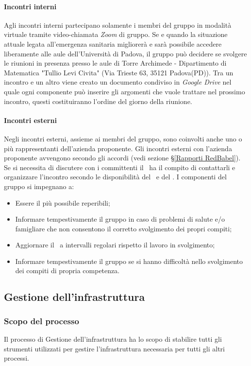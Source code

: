 \paragraph*{Incontri interni}
Agli incontri interni partecipano solamente i membri del gruppo in modalità virtuale tramite video-chiamata \textit{Zoom} di gruppo.
Se e quando la situazione attuale legata all'emergenza sanitaria migliorerà e sarà possibile accedere liberamente alle aule dell'Università di Padova, il gruppo può decidere se svolgere le riunioni in presenza presso le aule di Torre Archimede - Dipartimento di Matematica "Tullio Levi Civita" (Via Trieste 63, 35121 Padova(PD)).
Tra un incontro e un altro viene creato un documento condiviso in \textit{Google Drive} nel quale ogni componente può inserire gli argomenti che vuole trattare nel prossimo incontro, questi costituiranno l'ordine del giorno della riunione.
\paragraph*{Incontri esterni}
Negli incontri esterni, assieme ai membri del gruppo, sono coinvolti anche uno o più rappresentanti dell'azienda proponente.
Gli incontri esterni con l'azienda proponente avvengono secondo gli accordi (vedi sezione \S\ref{Rapporti RedBabel}). Se si necessita di discutere con i committenti il \Responsabile\ ha il compito di contattarli e organizzare l'incontro secondo le disponibilità del \VT\ e del \CR.
\label{NormeGenerali}
I componenti del gruppo si impegnano a:
\begin{itemize}
	\item Essere il più possibile reperibili;
	\item Informare tempestivamente il gruppo in caso di problemi di salute e/o famigliare che non consentono il corretto svolgimento dei propri compiti;
	\item Aggiornare il \Responsabile\ a intervalli regolari rispetto il lavoro in svolgimento;
	\item Informare tempestivamente il gruppo se si hanno difficoltà nello svolgimento dei compiti di propria competenza.
\end{itemize}

\subsection{Gestione dell'infrastruttura}
\subsubsection{Scopo del processo}\label{PO_GestioneInfrastruttura_Scopo}
Il processo di Gestione dell'infrastruttura ha lo scopo di stabilire tutti gli strumenti utilizzati per gestire l'infrastruttura necessaria per tutti gli altri processi.
